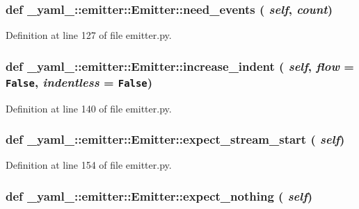 \subsubsection{\setlength{\rightskip}{0pt plus 5cm}def \_\-yaml\_\-::emitter::Emitter::need\_\-events ( {\em self},  {\em count})}\label{class__yaml___1_1emitter_1_1Emitter_1891f399847cb2c291980a301ddff2f5}




Definition at line 127 of file emitter.py.
\subsubsection{\setlength{\rightskip}{0pt plus 5cm}def \_\-yaml\_\-::emitter::Emitter::increase\_\-indent ( {\em self},  {\em flow} = {\tt False},  {\em indentless} = {\tt False})}\label{class__yaml___1_1emitter_1_1Emitter_07515389a3ff38a86163ed5fa454bad0}




Definition at line 140 of file emitter.py.
\subsubsection{\setlength{\rightskip}{0pt plus 5cm}def \_\-yaml\_\-::emitter::Emitter::expect\_\-stream\_\-start ( {\em self})}\label{class__yaml___1_1emitter_1_1Emitter_83e7a2c16f5a86767053602aad630464}




Definition at line 154 of file emitter.py.
\subsubsection{\setlength{\rightskip}{0pt plus 5cm}def \_\-yaml\_\-::emitter::Emitter::expect\_\-nothing ( {\em self})}\label{class__yaml___1_1emitter_1_1Emitter_93a4c58775c051492e02ef131a0fe6d8}




